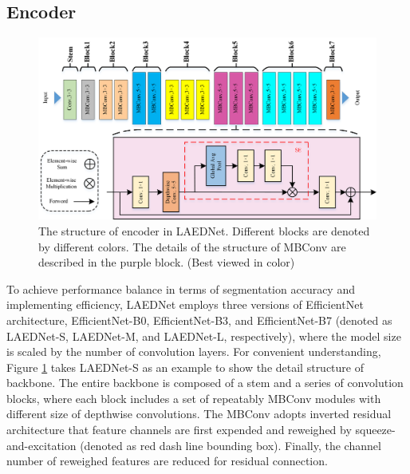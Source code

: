 \documentclass[review]{elsarticle}
\begin{document}
\subsection{Encoder}

\begin{figure}[!t]
	\centering
	\includegraphics[width=\textwidth,height=0.45\textheight]{Encoder3.png}
	\caption{The structure of encoder in LAEDNet. Different blocks are denoted by different colors. The details of the structure of MBConv are described in the purple block. (Best viewed in color)}
	\label{fig2}
\end{figure}

To achieve performance balance in terms of segmentation accuracy and implementing efficiency, LAEDNet employs three versions of EfficientNet\cite{2019EfficientNet} architecture, EfficientNet-B0, EfficientNet-B3, and EfficientNet-B7 (denoted as LAEDNet-S, LAEDNet-M, and LAEDNet-L, respectively), where the model size is scaled by the number of convolution layers. For convenient understanding, Figure \ref{fig2} takes LAEDNet-S as an example to show the detail structure of backbone. The entire backbone is composed of a stem and a series of convolution blocks, where each block includes a set of repeatably MBConv modules with different size of depthwise convolutions. The MBConv adopts inverted residual architecture that feature channels are first expended and reweighed by squeeze-and-excitation (denoted as red dash line bounding box). Finally, the channel number of reweighed features are reduced for residual connection.
\end{document}
